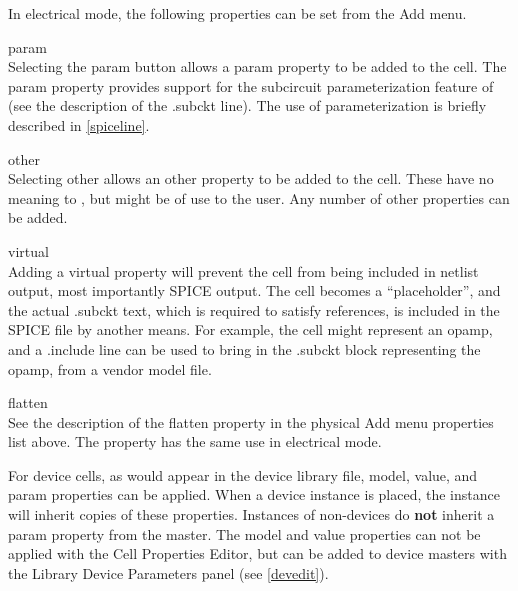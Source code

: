 In electrical mode, the following properties can be set from the
{\cb Add} menu.

\begin{description}
\item{\et param}\\
Selecting the {\cb param} button allows a {\et param} property to be
added to the cell.  The {\et param} property provides support for the
subcircuit parameterization feature of {\WRspice} (see the description
of the {\vt .subckt} line).  The use of parameterization is briefly
described in \ref{spiceline}.

\item{\et other}\\
Selecting {\cb other} allows an {\et other} property to be added to
the cell.  These have no meaning to {\Xic}, but might be of use to the
user.  Any number of {\et other} properties can be added.

\item{\et virtual}\\
Adding a {\et virtual} property will prevent the cell from being
included in netlist output, most importantly SPICE output.  The cell
becomes a ``placeholder'', and the actual {\vt .subckt} text, which is
required to satisfy references, is included in the SPICE file by
another means.  For example, the cell might represent an opamp, and a
{\vt .include} line can be used to bring in the {\vt .subckt} block
representing the opamp, from a vendor model file.

\item{\et flatten}\\
See the description of the {\et flatten} property in the physical {\cb
Add} menu properties list above.  The property has the same use in
electrical mode.
\end{description}

For device cells, as would appear in the device library file, {\et
model}, {\et value}, and {\et param} properties can be applied.  When
a device instance is placed, the instance will inherit copies of these
properties.  Instances of non-devices do {\bf not} inherit a {\et
param} property from the master.  The {\et model} and {\et value}
properties can not be applied with the {\cb Cell Properties Editor},
but can be added to device masters with the {\cb Library Device
Parameters} panel (see \ref{devedit}).
 
